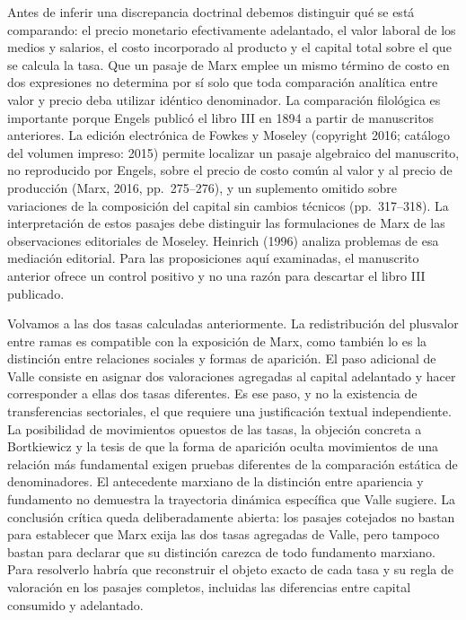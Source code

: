 \documentclass[10pt,twoside]{article}
\begin{document}
Antes de inferir una discrepancia doctrinal debemos distinguir qué se está comparando: el precio monetario efectivamente adelantado, el valor laboral de los medios y salarios, el costo incorporado al producto y el capital total sobre el que se calcula la tasa. Que un pasaje de Marx emplee un mismo término de costo en dos expresiones no determina por sí solo que toda comparación analítica entre valor y precio deba utilizar idéntico denominador. La comparación filológica es importante porque Engels publicó el libro III en 1894 a partir de manuscritos anteriores. La edición electrónica de Fowkes y Moseley (copyright 2016; catálogo del volumen impreso: 2015) permite localizar un pasaje algebraico del manuscrito, no reproducido por Engels, sobre el precio de costo común al valor y al precio de producción (Marx, 2016, pp.~275--276), y un suplemento omitido sobre variaciones de la composición del capital sin cambios técnicos (pp.~317--318). La interpretación de estos pasajes debe distinguir las formulaciones de Marx de las observaciones editoriales de Moseley. Heinrich (1996) analiza problemas de esa mediación editorial. Para las proposiciones aquí examinadas, el manuscrito anterior ofrece un control positivo y no una razón para descartar el libro III publicado.

Volvamos a las dos tasas calculadas anteriormente. La redistribución del plusvalor entre ramas es compatible con la exposición de Marx, como también lo es la distinción entre relaciones sociales y formas de aparición. El paso adicional de Valle consiste en asignar dos valoraciones agregadas al capital adelantado y hacer corresponder a ellas dos tasas diferentes. Es ese paso, y no la existencia de transferencias sectoriales, el que requiere una justificación textual independiente. La posibilidad de movimientos opuestos de las tasas, la objeción concreta a Bortkiewicz y la tesis de que la forma de aparición oculta movimientos de una relación más fundamental exigen pruebas diferentes de la comparación estática de denominadores. El antecedente marxiano de la distinción entre apariencia y fundamento no demuestra la trayectoria dinámica específica que Valle sugiere. La conclusión crítica queda deliberadamente abierta: los pasajes cotejados no bastan para establecer que Marx exija las dos tasas agregadas de Valle, pero tampoco bastan para declarar que su distinción carezca de todo fundamento marxiano. Para resolverlo habría que reconstruir el objeto exacto de cada tasa y su regla de valoración en los pasajes completos, incluidas las diferencias entre capital consumido y adelantado.
\end{document}
